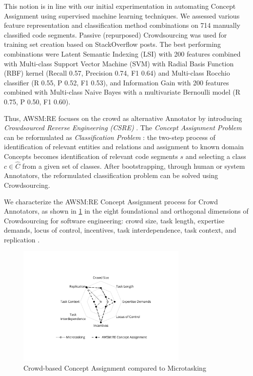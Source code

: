 This notion is in line with our initial experimentation in automating \gls{Concept Assignment} using supervised machine learning techniques.
We assessed various feature representation and classification method combinations on 714 manually classified code segments.
Passive (repurposed) \gls{Crowdsourcing} was used for training set creation based on StackOverflow posts.
The best performing combinations were Latent Semantic Indexing (LSI) with 200 features combined with Multi-class Support Vector Machine (SVM) with Radial Basis Function (RBF) kernel (Recall 0.57, Precision 0.74, F1 0.64) and Multi-class Rocchio classifier \autocite{Joachims1997Rocchio} (R 0.55, P 0.52, F1 0.53), and Information Gain with 200 features combined with Multi-class Naive Bayes with a multivariate Bernoulli model \autocite{McCallum1998NB} (R 0.75, P 0.50, F1 0.60).

Thus, AWSM:RE focuses on the crowd as alternative Annotator by introducing \emph{Crowdsourced Reverse Engineering (CSRE)} \autocite{Heil2018CSRE,Heil2019CSRECCIS}.
The \emph{Concept Assignment Problem} \autocite{Biggerstaff1993ConceptAssignmentICSE} can be reformulated as \emph{Classification Problem} \autocite{Heil2018CSRE,Heil2019CSRECCIS}: the two-step process of identification of relevant entities and relations and assignment to known domain \glspl{Concept} becomes identification of relevant code segments \(s\) and selecting a class \(c \in \hat C\) from a given set of classes.
After bootstrapping, through human or system Annotators, the reformulated classification problem can be solved using \gls{Crowdsourcing}.

We characterize the AWSM:RE \gls{Concept Assignment} process for Crowd Annotators, as shown in \cref{fig:awsm.re.crowddimensions} in the eight foundational and orthogonal dimensions of \gls{Crowdsourcing} for software engineering: crowd size, task length, expertise demands, locus of control, incentives, task interdependence, task context, and replication \autocite{Latoza2016}.

\begin{figure} [h!]
\hypertarget{fig:awsm.re.crowddimensions}{%
\centering
\includegraphics[width=0.75\textwidth]{../figures/spider.pdf}
\caption[Crowd-based Concept Assignment compared to Microtasking]{Crowd-based Concept Assignment compared to Microtasking \autocite{Heil2018CSRE}}\label{fig:awsm.re.crowddimensions}
}
\end{figure}

